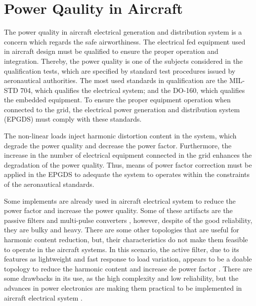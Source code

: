 \section{Power Qaulity in Aircraft}

The power quality in aircraft electrical generation and distribution system is a concern which regards the safe airworthiness. The electrical fed equipment used in aircraft design must be qualified to ensure the proper operation and integration. Thereby, the power quality is one of the subjects considered in the qualification tests, which are specified by standard test procedures issued by aeronautical authorities. The most used standards in qualification are the MIL-STD 704, which qualifies the electrical system; and the DO-160, which qualifies the embedded equipment. To ensure the proper equipment operation when connected to the grid, the electrical power generation and distribution system (EPGDS) must comply with these standards.

The non-linear loads inject harmonic distortion content in the system, which degrade the power quality and decrease the power factor. Furthermore, the increase in the number of electrical equipment connected in the grid enhances the degradation of the power quality. Thus, means of power factor correction must be applied in the EPGDS to adequate the system to operates within the constraints of the aeronautical standards.

Some implements are already used in aircraft electrical system to reduce the power factor and increase the power quality. Some of these artifacts are the passive filters and multi-pulse converters \citep{Zhu2014,Gong2003,Lobo2005}, however, despite of the good reliability, they are bulky and heavy. There are some other topologies that are useful for harmonic content reduction, but, their characteristics do not make them feasible to operate in the aircraft systems. In this scenario, the active filter, due to its features as lightweight and fast response to load variation, appears to be a doable topology to reduce the harmonic content and increase de power factor \citep{Zhu2014,Chen2012control,Karatzaferis2013}. There are some drawbacks in its use, as the high complexity and low reliability, but the advances in power electronics are making them practical to be implemented in aircraft electrical system \citep{Abdelhafez2009}.




